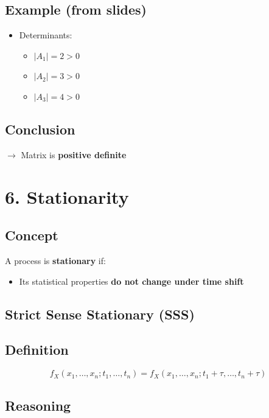 \documentclass[12pt]{article}
\begin{document}
\subsection*{Example (from slides)}

\begin{itemize}
\item Determinants:
\begin{itemize}
\item $|A_1| = 2 > 0$
\item $|A_2| = 3 > 0$
\item $|A_3| = 4 > 0$
\end{itemize}
\end{itemize}

\subsection*{Conclusion}

$\rightarrow$ Matrix is \textbf{positive definite}

\section*{6. Stationarity}

\subsection*{Concept}

A process is \textbf{stationary} if:

\begin{itemize}
\item Its statistical properties \textbf{do not change under time shift}
\end{itemize}

\subsection*{Strict Sense Stationary (SSS)}

\subsection*{Definition}

\[
f_X(x_1,\dots,x_n; t_1,\dots,t_n) = f_X(x_1,\dots,x_n; t_1+\tau,\dots,t_n+\tau)
\]

\subsection*{Reasoning}
\end{document}

